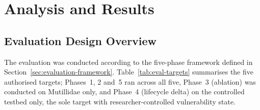 \documentclass[12pt, a4paper, oneside]{report}
\begin{document}
\FloatBarrier
 
\chapter{Analysis and Results}

\section{Evaluation Design Overview}
\label{sec:evaluation-overview}

The evaluation was conducted according to the five-phase framework defined in Section~\ref{sec:evaluation-framework}. Table~\ref{tab:eval-targets} summarises the five authorised targets; Phases~1, 2 and~5 ran across all five, Phase~3 (ablation) was conducted on Mutillidae only, and Phase~4 (lifecycle delta) on the controlled testbed only, the sole target with researcher-controlled vulnerability state.
\end{document}
